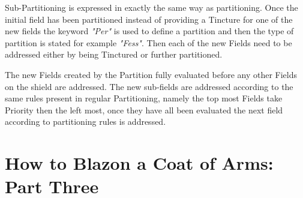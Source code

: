 Sub-Partitioning is expressed in exactly the same way as partitioning. Once the initial field has been partitioned instead of providing a Tincture for one of the new fields the keyword \emph{"Per"} is used to define a partition and then the type of partition is stated for example \emph{"Fess"}.  Then each of the new Fields need to be addressed either by being Tinctured or further partitioned. 

The new Fields created by the Partition fully evaluated before any other Fields on the shield are addressed.  The new sub-fields are addressed according to the same rules present in regular Partitioning, namely the top most Fields take Priority then the left most, once they have all been evaluated the next field according to partitioning rules is addressed.

\section{How to Blazon a Coat of Arms: Part Three}

